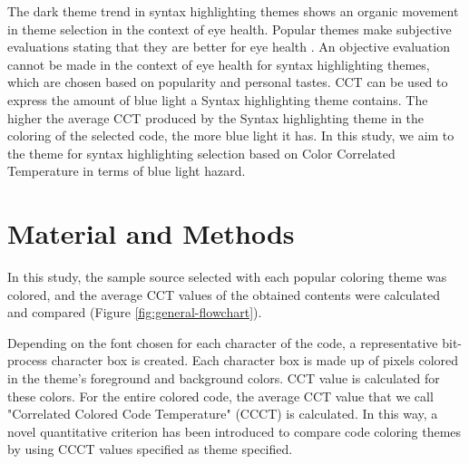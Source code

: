 \documentclass{article}
\begin{document}
The dark theme trend in syntax highlighting themes shows an organic movement in theme selection in the context of eye health. Popular themes make subjective evaluations stating that they are better for eye health \cite{suraj2020dark}. An objective evaluation cannot be made in the context of eye health for syntax highlighting themes, which are chosen based on popularity and personal tastes. CCT can be used to express the amount of blue light a Syntax highlighting theme contains. The higher the average CCT produced by the Syntax highlighting theme in the coloring of the selected code, the more blue light it has. In this study, we aim to the theme for syntax highlighting selection based on Color Correlated Temperature in terms of blue light hazard.

\section{Material and Methods} \label{sec:material-methods}
In this study, the sample source selected with each popular coloring theme was colored, and the average CCT values of the obtained contents were calculated and compared (Figure \ref{fig:general-flowchart}). 

Depending on the font chosen for each character of the code, a representative bit-process character box is created. Each character box is made up of pixels colored in the theme's foreground and background colors. CCT value is calculated for these colors. For the entire colored code, the average CCT value that we call "Correlated Colored Code Temperature" (CCCT) is calculated. In this way, a novel quantitative criterion has been introduced to compare code coloring themes by using CCCT values specified as theme specified.

\begin{comment}
AŞAĞIDAKİ PARAGRAFIN SON 3 CÜMLESİNİN ÇEVİRİSİ YUKARIDA

Bu renkler için CCT değeri hesaplanır. Renklendirilmiş kodun tamamı için "Correlated Colored Code Temperature" (CCCT) olarak adlandırdığımız ortalama CCT değeri hesaplanır. Bu şekilde temaya özgü olarak belirlenen CCCT değerleriyle kod renklendirme temalarının karşılaştırılması için yeni bir nicel ölçüt ortaya konulmuştur.

VEYA

Arka plan ve ön plan renkleri kapsadığı piksel alanları oranında o karakter kutusunun ortalama CCT değerine ve her bir karakter kutusu da o kutunun sıklığı oranında içeriğin tamamına ait ortalama CCT değerine katkıda bulunmaktadır. "Correlated Colored Code Temperature" (CCCT) olarak adlandırdığımız bu ortalama CCT değeri yüksek hassasiyete sahip olan mutlak bir değer olmaktan ziyade ilgili tema renkleriyle kaynak kodun bir bütün halde sahip olacağı ortalama CCT değeri hakkında bir yaklaşıklıklığı temsil etmektedir. Bu şekilde temaya özgü olarak belirlenen CCCT değerleriyle kod renklendirme temalarının karşılaştırılması için yeni bir nicel ölçüt ortaya
konulmuştur.
\end{comment}
\end{document}
